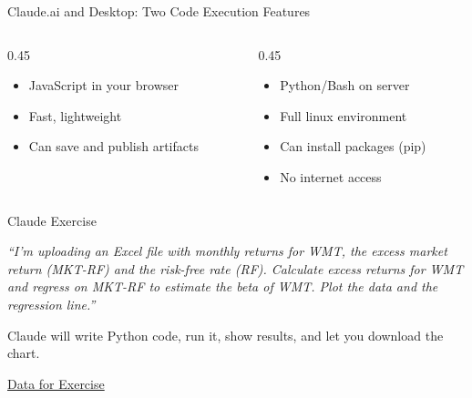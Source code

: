 \documentclass[aspectratio=169]{beamer}
\begin{document}
\begin{frame}{Claude.ai and Desktop: Two Code Execution Features}
\begin{columns}[T]
  \begin{column}{0.45\textwidth}
\begin{shadedbox}[title=\textbf{Artifacts}]
\begin{itemize}
  \item JavaScript in your browser
  \item Fast, lightweight
  \item Can save and publish artifacts
\end{itemize}
\end{shadedbox}
\end{column}
\begin{column}{0.45\textwidth}
\begin{shadedbox}[title=\textbf{Python Execution}]
\begin{itemize}
  \item Python/Bash on server
  \item Full linux environment
  \item \alert{Can install packages (pip)}
  \item No internet access
\end{itemize}
\end{shadedbox}
\end{column}
\end{columns}
\end{frame}

\begin{frame}{Claude Exercise}


\textit{``I'm uploading an Excel file with monthly returns for WMT, the excess market return (MKT-RF) and the risk-free rate (RF).  Calculate excess returns for WMT and regress on MKT-RF to estimate the beta of WMT.  Plot the data and the regression line.''}

\vspace{0.3cm}
Claude will write Python code, run it, show results, and let you download the chart.

\vspace{0.3cm}
\begin{shadedbox}
\centerline{\href{https://mgmt675.kerryback.com/files/betas.tex}{Data for Exercise}}
\end{shadedbox}
\end{frame}
\end{document}
